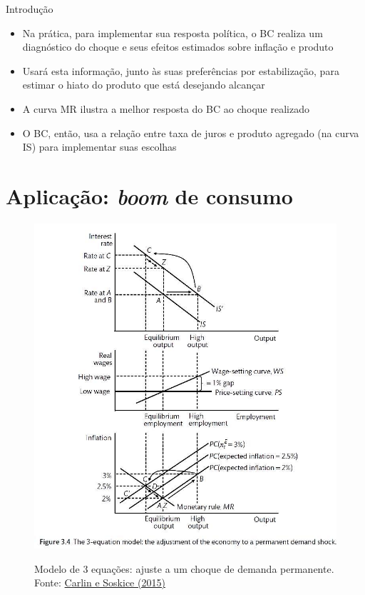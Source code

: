 \documentclass[10pt]{beamer}
\begin{document}
\begin{frame}
    {Introdução}
    \begin{itemize}
        \item Na prática, para implementar sua resposta política, o BC realiza um diagnóstico do choque e seus efeitos estimados sobre inflação e produto\bigskip
        \item Usará esta informação, junto às suas preferências por estabilização, para estimar o hiato do produto que está desejando alcançar\bigskip
        \item A curva MR ilustra a melhor resposta do BC ao choque realizado\bigskip
        \item O BC, então, usa a relação entre taxa de juros e produto agregado (na curva IS) para implementar suas escolhas
    \end{itemize}
\end{frame}

\section{Aplicação: \emph{boom} de consumo}
\begin{frame}
    \begin{figure}
        \href{https://bookdown.org/robohay/economicsnotes/Figures/Policy/demandshock.jpg}{\includegraphics[width=.45\textwidth]{./figures/aula16_fig2.jpg}}
        \caption{Modelo de 3 equações: ajuste a um choque de demanda permanente. Fonte: \href{https://bookdown.org/robohay/economicsnotes/Figures/Policy/demandshock.jpg}{Carlin e Soskice (2015)}}
    \end{figure}
\end{frame}
\end{document}
